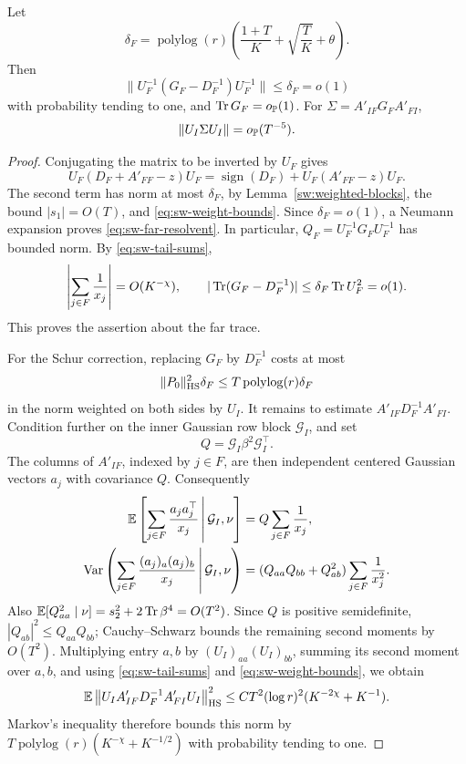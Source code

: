 \begin{lemma}\label{sw:schur}
Let
\[
 \delta_F=\operatorname{polylog}(r)
       \left(\frac{1+T}{K}+\sqrt{\frac TK}+\theta\right).
\]
Then
\begin{equation}\label{eq:sw-far-resolvent}
 \|U_F^{-1}(G_F-D_F^{-1})U_F^{-1}\|\le\delta_F=o(1)
\end{equation}
with probability tending to one, and \(\operatorname{Tr} G_F=o_{\mathbb P}(1)\).
For \(\Sigma=A'_{IF}G_FA'_{FI}\),
\begin{equation}\label{eq:sw-schur-small}
 \|U_I\Sigma U_I\|=o_{\mathbb P}(T^{-5}).
\end{equation}
\end{lemma}

\begin{proof}
Conjugating the matrix to be inverted by \(U_F\) gives
\[
 U_F(D_F+A'_{FF}-z)U_F
 =\operatorname{sign}(D_F)+U_F(A'_{FF}-z)U_F.
\]
The second term has norm at most \(\delta_F\), by
Lemma~\ref{sw:weighted-blocks}, the bound \(|s_1|=O(T)\), and
\eqref{eq:sw-weight-bounds}. Since \(\delta_F=o(1)\), a Neumann expansion
proves \eqref{eq:sw-far-resolvent}. In particular,
\(Q_F=U_F^{-1}G_FU_F^{-1}\) has bounded norm.
By \eqref{eq:sw-tail-sums},
\[
 \left|\sum_{j\in F}\frac1{x_j}\right|=O(K^{-\chi}),
 \qquad
 |\operatorname{Tr}(G_F-D_F^{-1})|
 \le\delta_F\operatorname{Tr} U_F^2=o(1).
\]
This proves the assertion about the far trace.

For the Schur correction, replacing \(G_F\) by \(D_F^{-1}\) costs at most
\begin{equation}\label{eq:sw-schur-replacement}
 \|P_0\|_{\mathrm{HS}}^2\delta_F
 \le T\operatorname{polylog}(r)\delta_F
\end{equation}
in the norm weighted on both sides by \(U_I\).
It remains to estimate
\(A'_{IF}D_F^{-1}A'_{FI}\).
Condition further on the inner Gaussian row block \(\mathcal G_I\), and set
\[
 Q=\mathcal G_I\beta^2\mathcal G_I^\top.
\]
The columns of \(A'_{IF}\), indexed by \(j\in F\), are then independent
centered Gaussian vectors \(a_j\) with covariance \(Q\).
Consequently
\begin{align*}
 \mathbb E\left[\sum_{j\in F}\frac{a_ja_j^\top}{x_j}
       \,\middle|\,\mathcal G_I,\nu\right]
 &=Q\sum_{j\in F}\frac1{x_j},\\
 \operatorname{Var}\left(\sum_{j\in F}\frac{(a_j)_a(a_j)_b}{x_j}
       \,\middle|\,\mathcal G_I,\nu\right)
 &=(Q_{aa}Q_{bb}+Q_{ab}^2)
       \sum_{j\in F}\frac1{x_j^2}.
\end{align*}
Also
\(\mathbb E[Q_{aa}^2\mid\nu]
 =s_2^2+2\operatorname{Tr}\beta^4=O(T^2)\).
Since \(Q\) is positive semidefinite,
\(|Q_{ab}|^2\le Q_{aa}Q_{bb}\); Cauchy--Schwarz bounds the remaining
second moments by \(O(T^2)\).
Multiplying entry \(a,b\) by \((U_I)_{aa}(U_I)_{bb}\), summing its second
moment over \(a,b\), and using \eqref{eq:sw-tail-sums} and
\eqref{eq:sw-weight-bounds}, we obtain
\[
 \mathbb E\left\|
 U_IA'_{IF}D_F^{-1}A'_{FI}U_I
 \right\|_{\mathrm{HS}}^2
 \le C T^2(\log r)^2(K^{-2\chi}+K^{-1}).
\]
Markov's inequality therefore bounds this norm by
\(T\operatorname{polylog}(r)(K^{-\chi}+K^{-1/2})\) with probability
tending to one.


\end{proof}
